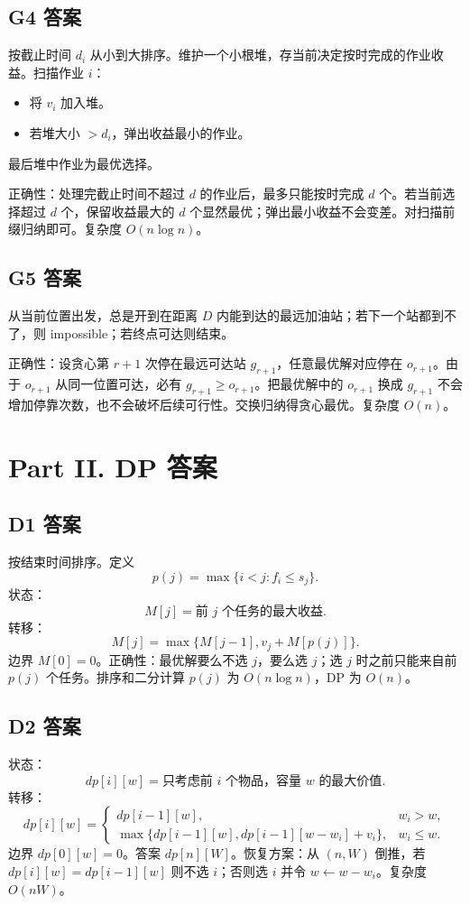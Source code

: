 \documentclass[UTF8,a4paper,11pt]{ctexart}
\begin{document}
\subsection*{G4 答案}

按截止时间 $d_i$ 从小到大排序。维护一个小根堆，存当前决定按时完成的作业收益。扫描作业 $i$：
\begin{itemize}
  \item 将 $v_i$ 加入堆。
  \item 若堆大小 $>d_i$，弹出收益最小的作业。
\end{itemize}
最后堆中作业为最优选择。

正确性：处理完截止时间不超过 $d$ 的作业后，最多只能按时完成 $d$ 个。若当前选择超过 $d$ 个，保留收益最大的 $d$ 个显然最优；弹出最小收益不会变差。对扫描前缀归纳即可。复杂度 $O(n\log n)$。

\subsection*{G5 答案}

从当前位置出发，总是开到在距离 $D$ 内能到达的最远加油站；若下一个站都到不了，则 impossible；若终点可达则结束。

正确性：设贪心第 $r+1$ 次停在最远可达站 $g_{r+1}$，任意最优解对应停在 $o_{r+1}$。由于 $o_{r+1}$ 从同一位置可达，必有 $g_{r+1}\ge o_{r+1}$。把最优解中的 $o_{r+1}$ 换成 $g_{r+1}$ 不会增加停靠次数，也不会破坏后续可行性。交换归纳得贪心最优。复杂度 $O(n)$。

\newpage
\section*{Part II. DP 答案}

\subsection*{D1 答案}

按结束时间排序。定义
\[
p(j)=\max\{i<j:f_i\le s_j\}.
\]
状态：
\[
M[j]=\text{前 }j\text{ 个任务的最大收益}.
\]
转移：
\[
M[j]=\max\{M[j-1],v_j+M[p(j)]\}.
\]
边界 $M[0]=0$。正确性：最优解要么不选 $j$，要么选 $j$；选 $j$ 时之前只能来自前 $p(j)$ 个任务。排序和二分计算 $p(j)$ 为 $O(n\log n)$，DP 为 $O(n)$。

\subsection*{D2 答案}

状态：
\[
dp[i][w]=\text{只考虑前 }i\text{ 个物品，容量 }w\text{ 的最大价值}.
\]
转移：
\[
dp[i][w]=
\begin{cases}
dp[i-1][w], & w_i>w,\\
\max\{dp[i-1][w],dp[i-1][w-w_i]+v_i\}, & w_i\le w.
\end{cases}
\]
边界 $dp[0][w]=0$。答案 $dp[n][W]$。恢复方案：从 $(n,W)$ 倒推，若 $dp[i][w]=dp[i-1][w]$ 则不选 $i$；否则选 $i$ 并令 $w\leftarrow w-w_i$。复杂度 $O(nW)$。
\end{document}
